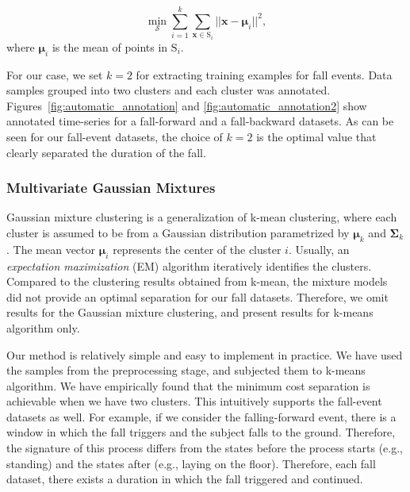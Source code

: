\documentclass[]{IEEEtran}
\begin{document}
$$ \min _{\mathcal{S}} \sum_{i=1}^{k} \sum_{\mathbf{x} \in \mathrm{S}_i} || \mathbf{x} - 
\boldsymbol{\mu}_i 
||^2,$$
where $\boldsymbol{\mu}_i $ is the mean of points in $\mathrm{S}_i$.

For our case, we set $k = 2$ for extracting  training examples for fall events. Data samples grouped into two
clusters and  each cluster was annotated. Figures~\ref{fig:automatic_annotation} and 
\ref{fig:automatic_annotation2}  show annotated time-series for a fall-forward and a fall-backward datasets. As can be seen for our fall-event datasets, the choice of $k=2$ is the 
optimal value that clearly separated the duration of the fall. 


\subsubsection{Multivariate Gaussian Mixtures}

Gaussian mixture clustering is a generalization of k-mean clustering, where each cluster 
is assumed to be from a Gaussian distribution parametrized by $\boldsymbol{\mu}_k$ and 
$\boldsymbol{\Sigma}_k$. The mean vector $\boldsymbol{\mu}_i$ represents the center of the 
cluster $i$. 
Usually, an \emph{expectation maximization} (EM) algorithm iteratively identifies the 
clusters. Compared to the clustering results obtained from k-mean, the mixture models did not 
provide an optimal separation for our fall datasets. Therefore, we omit results for the Gaussian mixture clustering, and present results for
k-means algorithm only. 
 


Our method is relatively simple and easy to implement in practice. We have used the 
samples from the preprocessing stage, and subjected them to k-means algorithm. We have empirically found that the minimum cost separation is 
achievable when we have two clusters. This intuitively supports the fall-event datasets 
as well. For 
example, if we consider the falling-forward event, there is a window in which the fall 
triggers and the subject falls to the ground. Therefore, the signature of this process 
differs from the states before the process starts (e.g., standing) and the states after 
(e.g., laying on the floor). Therefore, each fall dataset, there exists a duration in 
which the fall triggered and continued.
\end{document}
